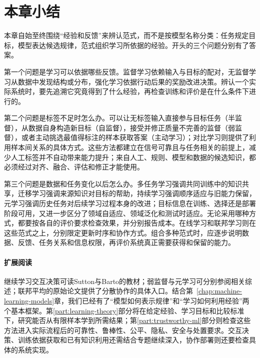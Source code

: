 \section{本章小结}
\label{sec:machine-learning-paradigms-summary}

本章自始至终围绕“经验和反馈”来辨认范式，而不是按模型名称分类：任务规定目标，模型表达候选规律，范式组织学习所依据的经验。开头的三个问题分别有了答案。

第一个问题是学习可以依据哪些反馈。监督学习依赖输入与目标的配对，无监督学习从数据中发现结构或分布，强化学习依据行动后果的奖励改进决策。辨认一个实际系统时，要先追溯它究竟得到了什么经验，再检查训练和评价是在什么条件下进行的。

第二个问题是标签不足时怎么办。可以让无标签输入直接参与目标任务（半监督），从数据自身构造新目标（自监督），接受并修正质量不完善的监督（弱监督），或者主动挑选最值得标注的样本获取答案（主动学习）；对比学习则提供了利用样本间关系的具体方式。这些方法都建立在信号可靠且与任务相关的前提上，减少人工标签并不自动带来能力提升；来自人工、规则、模型和数据的候选知识，都必须经过对齐、融合、评估和修正才能使用。

第三个问题是数据和任务变化以后怎么办。多任务学习强调共同训练中的知识共享，迁移学习强调来源知识对目标的帮助，持续学习强调顺序适应与旧能力保留，元学习强调历史任务对后续学习过程本身的改进；目标信息在训练、选择还是部署阶段可用，又进一步区分了领域自适应、领域泛化和测试时适应。无论采用哪种方式，都要按各自的评价要求检查效果，并分别报告成本。在线学习和联邦学习则在这些范式之上，分别限定更新时序和协作方式。组合多种范式时，应逐步说明数据、反馈、任务关系和信息权限，再评价系统真正需要获得和保留的能力。

\paragraph{扩展阅读}

继续学习交互决策可读Sutton与Barto的教材；弱监督与元学习可分别参阅相关综述；联邦平均的原始论文提供了分散协作的具体入口。结合第~\ref{chap:machine-learning-models}章，我们已经有了“模型如何表示规律”和“学习如何利用经验”两个基本框架。第\ref{part:learning-theory}部分将在给定经验、学习目标和比较标准下，研究能否从有限样本学到所需结果；第\ref{part:trustworthy-ml}部分则检查这些方法进入实际流程后的可靠性、鲁棒性、公平、隐私、安全与处置要求。交互决策、训练依据获取和已有知识利用还需结合专题继续深入，协作部署则还要检查具体的系统实现。
